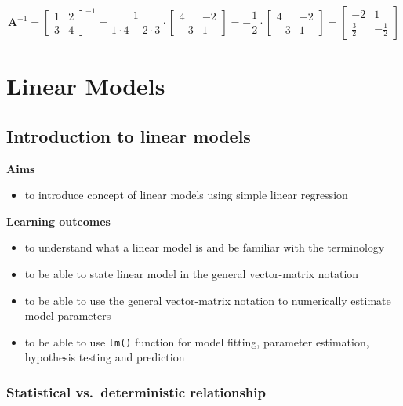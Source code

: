 \documentclass[
]{book}
\providecommand{\tightlist}{%
  \setlength{\itemsep}{0pt}\setlength{\parskip}{0pt}}
\theoremstyle{definition}
\theoremstyle{definition}
\theoremstyle{definition}
\theoremstyle{remark}
\begin{document}
\[\mathbf{A}^{-1} = \begin{bmatrix}
  1 & 2   \\
  3 & 4 
\end{bmatrix}^{-1} = \frac{1}{1 \cdot 4 - 2 \cdot 3} \cdot \begin{bmatrix}
  4 & -2   \\
  -3 & 1
\end{bmatrix} = -\frac{1}{2} \cdot \begin{bmatrix}
  4 & -2   \\
  -3 & 1
\end{bmatrix} = \begin{bmatrix}
  -2 & 1   \\
  \frac{3}{2} & -\frac{1}{2}
\end{bmatrix}\]

\hypertarget{part-linear-models}{%
\part{Linear Models}\label{part-linear-models}}

\hypertarget{introduction-to-linear-models}{%
\chapter{Introduction to linear models}\label{introduction-to-linear-models}}

\textbf{Aims}

\begin{itemize}
\tightlist
\item
  to introduce concept of linear models using simple linear regression
\end{itemize}

\textbf{Learning outcomes}

\begin{itemize}
\tightlist
\item
  to understand what a linear model is and be familiar with the terminology
\item
  to be able to state linear model in the general vector-matrix notation
\item
  to be able to use the general vector-matrix notation to numerically estimate model parameters
\item
  to be able to use \texttt{lm()} function for model fitting, parameter estimation, hypothesis testing and prediction
\end{itemize}

\hypertarget{statistical-vs.-deterministic-relationship}{%
\section{Statistical vs.~deterministic relationship}\label{statistical-vs.-deterministic-relationship}}
\end{document}
